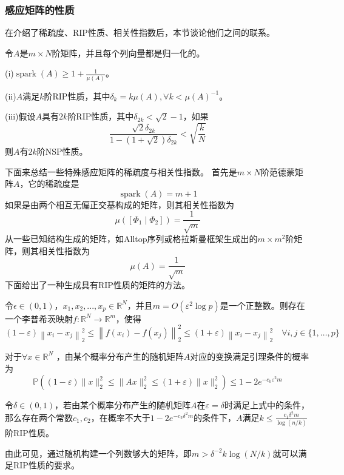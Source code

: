 \subsubsection{感应矩阵的性质}
在介绍了稀疏度、RIP性质、相关性指数后，本节谈论他们之间的联系。
\begin{theorem}
    令$A$是$m\times N$阶矩阵，并且每个列向量都是归一化的。\par
    (i)$\operatorname{spark}(A) \geq 1+\frac{1}{\mu(A)}$。\par
    (ii)$A$满足$k$阶RIP性质，其中$\delta_k=k \mu(A),\forall  k<\mu(A)^{-1}$。\par
    (iii)假设$A$具有$2k$阶RIP性质，其中$\delta_{2 k}<\sqrt{2} -1$，如果
    \begin{equation}
        \frac{\sqrt{2} \delta_{2 k}}{1-(1+\sqrt{2}) \delta_{2 k}}<\sqrt{\frac{k}{N}}
    \end{equation}
    则$A$有$2k$阶NSP性质。
\end{theorem}
下面来总结一些特殊感应矩阵的稀疏度与相关性指数。
首先是$m\times N$阶范德蒙矩阵$A$，它的稀疏度是
\begin{equation}
    \operatorname{spark}(A)=m+1
\end{equation}
如果是由两个相互无偏正交基构成的矩阵，则其相关性指数为
\begin{equation}
    \mu\left(\left[\Phi_1 \mid \Phi_2\right]\right)=\frac{1}{\sqrt{m}}
\end{equation}
从一些已知结构生成的矩阵，如Alltop序列或格拉斯曼框架生成出的$m\times m^2$阶矩阵，则其相关性指数为
\begin{equation}
    \mu(A)=\frac{1}{\sqrt{m}}
\end{equation}
下面给出了一种生成具有RIP性质的矩阵的方法。
\begin{lemma}
    令$\epsilon \in \left( 0,1\right)$，$x_1,x_2,...,x_p\in \mathbb{R}^N$，并且$m=O\left(\varepsilon^2
    \log p\right)$是一个正整数。则存在一个李普希茨映射$f:\mathbb{R}^N \rightarrow \mathbb{R}^m$，使得
    \begin{equation}
        (1-\varepsilon)\left\|x_i-x_j\right\|_2^2 \leq\left\|f\left(x_i\right)-f\left(x_j\right)\right\|_2^2 
        \leq(1+\varepsilon)\left\|x_i-x_j\right\|_2^2 \quad \forall i,j \in\{1,\ldots,p\}
    \end{equation}
\end{lemma}
对于$\forall x \in \mathbb{R}^N$ ，由某个概率分布产生的随机矩阵$A$对应的变换满足引理条件的概率为
\begin{equation}
    \mathbb{P}\left((1-\varepsilon)\|x\|_2^2 \leq\|A x\|_2^2 \leq(1+\varepsilon)\|x\|_2^2\right) \leq 1-2 e^{-c_0 \varepsilon^2 m}
\end{equation}
\begin{theorem}
    令$\delta \in (0,1)$，若由某个概率分布产生的随机矩阵$A$在$\varepsilon =\delta$时满足上式中的条件，
    那么存在两个常数$c_1,c_2$，在概率不大于$1-2 e^{-c_2 \delta^2 m}$的条件下，$A$满足$k \leq  \frac{c_1 \delta^2m}{\log (n / k)}$阶RIP性质。
\end{theorem}
由此可见，通过随机构建一个列数够大的矩阵，即$m>\delta^{-2} k \log (N / k)$就可以满足RIP性质的要求。
